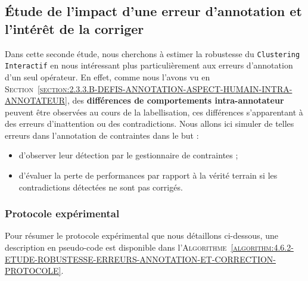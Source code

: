 	
	\subsection{Étude de l'impact d'une erreur d'annotation et l'intérêt de la corriger}
	\label{section:4.6.2-ETUDE-ROBUSTESSE-ERREURS-ANNOTATION-ET-CORRECTION}
		
		Dans cette seconde étude, nous cherchons à estimer la robustesse du \texttt{Clustering Interactif} en nous intéressant plus particulièrement aux erreurs d'annotation d'un seul opérateur.
		En effet, comme nous l'avons vu en \textsc{Section~\ref{section:2.3.3.B-DEFIS-ANNOTATION-ASPECT-HUMAIN-INTRA-ANNOTATEUR}}, des \textbf{différences de comportements intra-annotateur} peuvent être observées au cours de la labellisation, ces différences s'apparentant à des erreurs d'inattention ou des contradictions.
		Nous allons ici simuler de telles erreurs dans l'annotation de contraintes dans le but :
		\begin{itemize}
			\item d'observer leur détection par le gestionnaire de contraintes ;
			\item d'évaluer la perte de performances par rapport à la vérité terrain si les contradictions détectées ne sont pas corrigés.
		\end{itemize}
	
		\subsubsection{Protocole expérimental}
			
			Pour résumer le protocole expérimental que nous détaillons ci-dessous, une description en pseudo-code est disponible dans l'\textsc{Algorithme~\ref{algorithm:4.6.2-ETUDE-ROBUSTESSE-ERREURS-ANNOTATION-ET-CORRECTION-PROTOCOLE}}.
			
